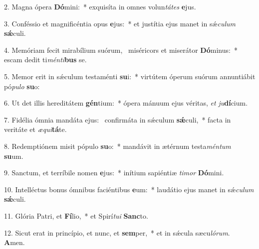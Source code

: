 2. Magna ópera \textbf{Dó}mini:~*  exquisíta in omnes volun\textit{tá}\textit{tes} \textbf{e}jus.\

3. Conféssio et magnificéntia opus \textbf{e}jus:~*  et justítia ejus manet in sǽ\textit{cu}\textit{lum} \textbf{sǽ}culi.\

4. Memóriam fecit mirabílium suórum, \dag\  miséricors et miserátor \textbf{Dó}minus:~*  escam dedit ti\textit{mén}\textit{ti}\textbf{bus} se.\

5. Memor erit in sǽculum testaménti \textbf{su}i:~*  virtútem óperum suórum annuntiábit pó\textit{pu}\textit{lo} \textbf{su}o:\

6. Ut det illis hereditátem \textbf{gén}tium:~*  ópera mánuum ejus véritas, \textit{et} \textit{ju}\textbf{dí}cium.\

7. Fidélia ómnia mandáta ejus: \dag\  confirmáta in sǽculum \textbf{sǽ}culi,~*  facta in veritáte et \textit{æ}\textit{qui}\textbf{tá}te.\

8. Redemptiónem misit pópulo \textbf{su}o:~*  mandávit in ætérnum testa\textit{mén}\textit{tum} \textbf{su}um.\

9. Sanctum, et terríbile nomen \textbf{e}jus:~*  inítium sapiéntiæ \textit{ti}\textit{mor} \textbf{Dó}mini.\

10. Intelléctus bonus ómnibus faciéntibus \textbf{e}um:~*  laudátio ejus manet in sǽ\textit{cu}\textit{lum} \textbf{sǽ}culi.\

11. Glória Patri, et \textbf{Fí}lio,~*  et Spirí\textit{tu}\textit{i} \textbf{Sanc}to.\

12. Sicut erat in princípio, et nunc, et \textbf{sem}per,~*  et in sǽcula sæcu\textit{ló}\textit{rum}. \textbf{A}men.\

